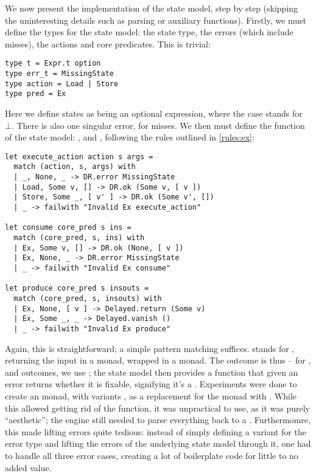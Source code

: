We now present the implementation of the \Ex{} state model, step by step (skipping the uninteresting details such as parsing or auxiliary functions). Firstly, we must define the types for the state model: the state type, the errors (which include misses), the actions and core predicates. This is trivial: \begin{lstlisting}
type t = Expr.t option
type err_t = MissingState
type action = Load | Store
type pred = Ex
\end{lstlisting}
Here we define states as being an optional expression, where the  case stands for $\bot$. There is also one singular error, for misses. We then must define the function of the state model: \execac, \consume{} and \produce, following the rules outlined in \cref{rules:ex}: \begin{lstlisting}
let execute_action action s args =
  match (action, s, args) with
  | _, None, _ -> DR.error MissingState
  | Load, Some v, [] -> DR.ok (Some v, [ v ])
  | Store, Some _, [ v' ] -> DR.ok (Some v', [])
  | _ -> failwith "Invalid Ex execute_action"

let consume core_pred s ins =
  match (core_pred, s, ins) with
  | Ex, Some v, [] -> DR.ok (None, [ v ])
  | Ex, None, _ -> DR.error MissingState
  | _ -> failwith "Invalid Ex consume"

let produce core_pred s insouts =
  match (core_pred, s, insouts) with
  | Ex, None, [ v ] -> Delayed.return (Some v)
  | Ex, Some _, _ -> Delayed.vanish ()
  | _ -> failwith "Invalid Ex produce"
\end{lstlisting}
Again, this is straightforward; a simple pattern matching suffices.  stands for \mbox{}, returning the input in a  monad, wrapped in a  monad. The outcome is thus \Ok{} -- for \Err{}, \LFail{} and \Miss{} outcomes, we use ; the state model then provides a  function that given an error returns whether it is fixable, signifying it's a \Miss. Experiments were done to create an  monad, with variants , as a replacement for the  monad with . While this allowed getting rid of the  function, it was unpractical to use, as it was purely ``aesthetic''; the engine still needed to parse everything back to a . Furthermomre, this made lifting errors quite tedious: instead of simply defining a variant  for the error type and lifting the errors of the underlying state model through it, one had to handle all three error cases, creating a lot of boilerplate code for little to no added value.

